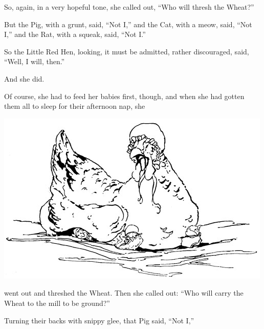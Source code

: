 \documentclass[letterpaper, 10pt, openany]{memoir}
\begin{document}
\vspace{\onelineskip}

So, again, in a very hopeful tone, she called out, ``Who will thresh the Wheat?''

\vspace{\onelineskip}

But the Pig, with a grunt, said, ``Not I,'' and the Cat, with a meow, said, ``Not I,'' and the Rat,
with a squeak, said, ``Not I.''

\vspace{\onelineskip}

So the Little Red Hen, looking, it must be admitted, rather discouraged, said, ``Well, I will,
then.''

\vspace{\onelineskip}

And she did.

\newpage
Of course, she had to feed her babies first, though, and when she had gotten them all to sleep for
their afternoon nap, she

\begin{center}
	\includegraphics[width=\textwidth]{image_021.jpg}
\end{center}

went out and threshed the Wheat. Then she called out: ``Who will carry the Wheat to the mill to be
ground?''

\vspace{\onelineskip}

Turning their backs with snippy glee, that Pig said, ``Not I,''
\end{document}
